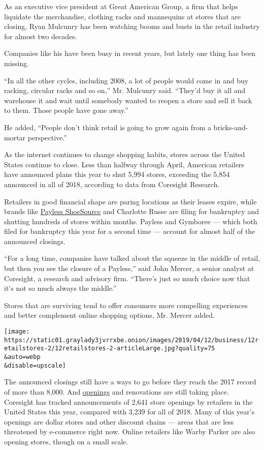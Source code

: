As an executive vice president at Great American Group, a firm that
helps liquidate the merchandise, clothing racks and mannequins at stores
that are closing, Ryan Mulcunry has been watching booms and busts in the
retail industry for almost two decades.

Companies like his have been busy in recent years, but lately one thing
has been missing.

``In all the other cycles, including 2008, a lot of people would come in
and buy racking, circular racks and so on,'' Mr. Mulcunry said. ``They'd
buy it all and warehouse it and wait until somebody wanted to reopen a
store and sell it back to them. Those people have gone away.''

He added, ``People don't think retail is going to grow again from a
bricks-and-mortar perspective.''

As the internet continues to change shopping habits, stores across the
United States continue to close. Less than halfway through April,
American retailers have announced plans this year to shut 5,994 stores,
exceeding the 5,854 announced in all of 2018, according to data from
Coresight Research.

Retailers in good financial shape are paring locations as their leases
expire, while brands like
\href{https://www.nytimes3xbfgragh.onion/2019/02/16/business/payless-shoes-stores.html}{Payless
ShoeSource} and Charlotte Russe are filing for bankruptcy and shutting
hundreds of stores within months. Payless and Gymboree --- which both
filed for bankruptcy this year for a second time --- account for almost
half of the announced closings.

``For a long time, companies have talked about the squeeze in the middle
of retail, but then you see the closure of a Payless,'' said John
Mercer, a senior analyst at Coresight, a research and advisory firm.
``There's just so much choice now that it's not so much always the
middle.''

Stores that are surviving tend to offer consumers more compelling
experiences and better complement online shopping options, Mr. Mercer
added.

\texttt{[image: https://static01.graylady3jvrrxbe.onion/images/2019/04/12/business/12retailstores-2/12retailstores-2-articleLarge.jpg?quality=75\\\&auto=webp\\\&disable=upscale]}

The announced closings still have a ways to go before they reach the
2017 record of more than 8,000. And
\href{https://www.nytimes3xbfgragh.onion/2018/09/03/business/retail-walmart-amazon-economy.html}{openings}
and renovations are still taking place. Coresight has tracked
announcements of 2,641 store openings by retailers in the United States
this year, compared with 3,239 for all of 2018. Many of this year's
openings are dollar stores and other discount chains --- areas that are
less threatened by e-commerce right now. Online retailers like Warby
Parker are also opening stores, though on a small scale.

